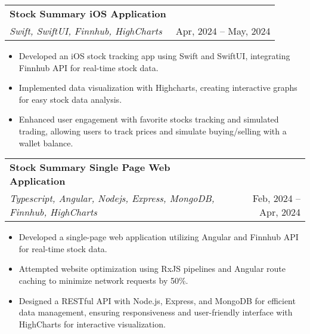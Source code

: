 \documentclass[letterpaper,11pt]{article}
\makeatletter
\newcommand{\resumeItem}[1]{
  \item\small{
    {#1 \vspace{-2pt}}
  }
}
\newcommand{\resumeProjectHeading}[1]{
    \item
    \begin{tabular*}{1.001\textwidth}{l@{\extracolsep{\fill}}r}
      \small#1\\
    \end{tabular*}\vspace{-7pt}
}
\newcommand{\resumeItemListStart}{\begin{itemize}}
\newcommand{\resumeItemListEnd}{\end{itemize}\vspace{-5pt}}
\makeatother
\begin{document}
\resumeProjectHeading
{\textbf{Stock Summary iOS Application \href{https://drive.google.com/file/d/13OWHwxpiQEl2slM0-ieL7HKOwFjjfK7o/view?usp=sharing}{\faLink}} \\
  \emph{Swift, SwiftUI, Finnhub, HighCharts} & {Apr, 2024 -- May, 2024}}
\vspace{-3pt}
\resumeItemListStart
\resumeItem{Developed an iOS stock tracking app using Swift and SwiftUI, integrating Finnhub API for real-time stock data.}
\resumeItem{Implemented data visualization with Highcharts, creating interactive graphs for easy stock data analysis.}
\resumeItem{Enhanced user engagement with favorite stocks tracking and simulated trading, allowing users to track prices and simulate buying/selling with a wallet balance.}
\resumeItemListEnd
\vspace{-6pt}

\resumeProjectHeading
{\textbf{Stock Summary Single Page Web Application \href{https://stock-search-h6gy.onrender.com}{\faLink}} \\
  \emph{Typescript, Angular, Nodejs, Express, MongoDB, Finnhub, HighCharts} & {Feb, 2024 -- Apr, 2024}}
\vspace{-3pt}
\resumeItemListStart
\resumeItem{Developed a single-page web application utilizing Angular and Finnhub API for real-time stock data.}
\resumeItem{Attempted website optimization using RxJS pipelines and Angular route caching to minimize network requests by 50\%.}
\resumeItem{Designed a RESTful API with Node.js, Express, and MongoDB for efficient data management, ensuring responsiveness and user-friendly interface with HighCharts for interactive visualization.}
\resumeItemListEnd
\vspace{-6pt}

\end{document}
